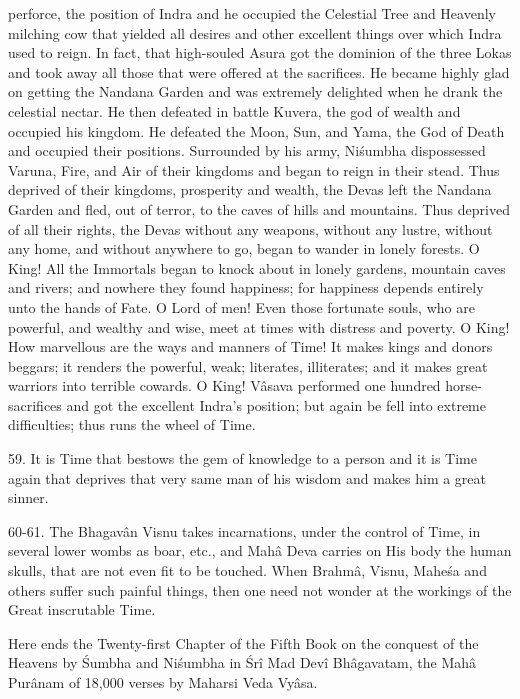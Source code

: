perforce, the position of Indra and he occupied the Celestial Tree and Heavenly milching cow that yielded all desires and other excellent things over which Indra used to reign. In fact, that high-souled Asura got the dominion of the three Lokas and took away all those that were offered at the sacrifices. He became highly glad on getting the Nandana Garden and was extremely delighted when he drank the celestial nectar. He then defeated in battle Kuvera, the god of wealth and occupied his kingdom. He defeated the Moon, Sun, and Yama, the God of Death and occupied their positions. Surrounded by his army, Ni\'sumbha dispossessed Varuna, Fire, and Air of their kingdoms and began to reign in their stead. Thus deprived of their kingdoms, prosperity and wealth, the Devas left the Nandana Garden and fled, out of terror, to the caves of hills and mountains. Thus deprived of all their rights, the Devas without any weapons, without any lustre, without any home, and without anywhere to go, began to wander in lonely forests. O King! All the Immortals began to knock about in lonely gardens, mountain caves and rivers; and nowhere they found happiness; for happiness depends entirely unto the hands of Fate. O Lord of men! Even those fortunate souls, who are powerful, and wealthy and wise, meet at times with distress and poverty. O King! How marvellous are the ways and manners of Time! It makes kings and donors beggars; it renders the powerful, weak; literates, illiterates; and it makes great warriors into terrible cowards. O King! V\^asava performed one hundred horse-sacrifices and got the excellent Indra's position; but again be fell into extreme difficulties; thus runs the wheel of Time.

59. It is Time that bestows the gem of knowledge to a person and it is Time again that deprives that very same man of his wisdom and makes him a great sinner.

60-61. The Bhagav\^an Visnu takes incarnations, under the control of Time, in several lower wombs as boar, etc., and Mah\^a Deva carries on His body the human skulls, that are not even fit to be touched. When Brahm\^a, Visnu, Mahe\'sa and others suffer such painful things, then one need not wonder at the workings of the Great inscrutable Time.

Here ends the Twenty-first Chapter of the Fifth Book on the conquest of the Heavens by \'Sumbha and Ni\'sumbha in \'Sr\^i Mad Dev\^i Bh\^agavatam, the Mah\^a Pur\^anam of 18,000 verses by Maharsi Veda Vy\^asa.

